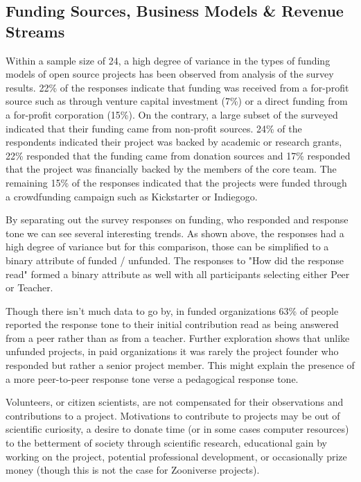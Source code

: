 \subsection{Funding Sources, Business Models \& Revenue Streams}

Within a sample size of 24, a high degree of variance in the types of funding models of open source projects has been observed from analysis of the survey results. 22\% of the responses indicate that funding was received from a for-profit source such as through venture capital investment (7\%) or a direct funding from a for-profit corporation (15\%). On the contrary, a large subset of the surveyed indicated that their funding came from non-profit sources. 24\% of the respondents indicated their project was backed by academic or research grants, 22\% responded that the funding came from donation sources and 17\% responded that the project was financially backed by the members of the core team. The remaining 15\% of the responses indicated that the projects were funded through a crowdfunding campaign such as Kickstarter or Indiegogo.




By separating out the survey responses on funding, who responded and response tone we can see several interesting trends. As shown above, the responses had a high degree of variance but for this comparison, those can be simplified to a binary attribute of funded / unfunded. The responses to "How did the response read" formed a binary attribute as well with all participants selecting either Peer or Teacher.

Though there isn't much data to go by, in funded organizations 63\% of people reported the response tone to their initial contribution read as being answered from a peer rather than as from a teacher. Further exploration shows that unlike unfunded projects, in paid organizations it was rarely the project founder who responded but rather a senior project member. This might explain the presence of a more peer-to-peer response tone verse a pedagogical response tone.


Volunteers, or citizen scientists, are not compensated for their observations and contributions to a project. Motivations to contribute to projects may be out of scientific curiosity, a desire to donate time (or in some cases computer resources) to the betterment of society through scientific research, educational gain by working on the project, potential professional development, or occasionally prize money (though this is not the case for Zooniverse projects).

